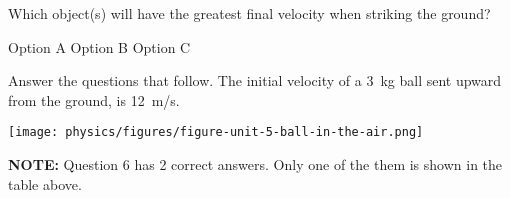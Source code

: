 \documentclass[answers,dvipsnames]{exam}
\begin{document}
\begin{questions}
\question
Which object(s) will have the greatest final velocity when striking the ground?

\begin{randomizechoices}[norandomize]
    \choice Option A
    \correctchoice Option B
    \choice Option C
\end{randomizechoices}

\question
Answer the questions that follow. The initial velocity of a \SI{3}{kg} ball sent upward from the ground, is \SI{12}{m/s}. 


\begin{center}
    \texttt{[image: physics/figures/figure-unit-5-ball-in-the-air.png]}
\end{center}


\clearpage
\printkeytable
\bigskip

\textbf{NOTE:} Question 6 has 2 correct answers. Only one of the them is shown in the table above.



\end{questions}
\end{document}
